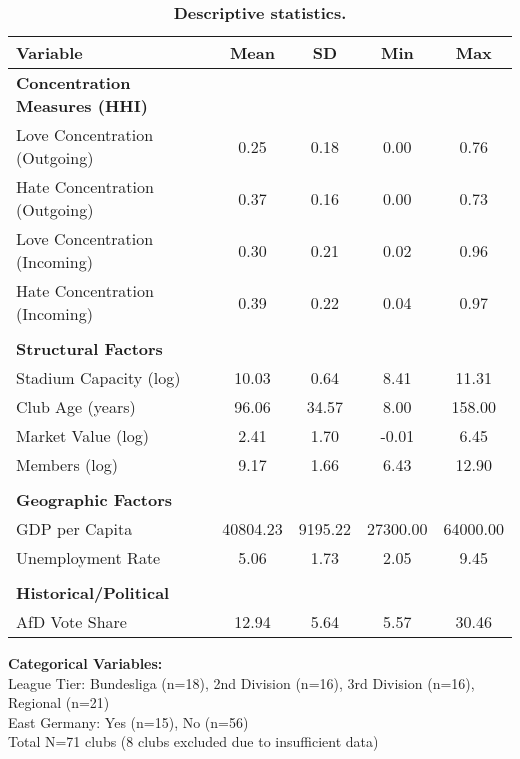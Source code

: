 \begin{table}[!ht]
\centering
\caption{\textbf{Descriptive statistics.}}
\begin{tabular}{lcccc}
\hline
\textbf{Variable} & \textbf{Mean} & \textbf{SD} & \textbf{Min} & \textbf{Max} \\
\hline
\textbf{Concentration Measures (HHI)} & & & & \\
Love Concentration (Outgoing) & 0.25 & 0.18 & 0.00 & 0.76 \\
Hate Concentration (Outgoing) & 0.37 & 0.16 & 0.00 & 0.73 \\
Love Concentration (Incoming) & 0.30 & 0.21 & 0.02 & 0.96 \\
Hate Concentration (Incoming) & 0.39 & 0.22 & 0.04 & 0.97 \\
& & & & \\
\textbf{Structural Factors} & & & & \\
Stadium Capacity (log) & 10.03 & 0.64 & 8.41 & 11.31 \\
Club Age (years) & 96.06 & 34.57 & 8.00 & 158.00 \\
Market Value (log) & 2.41 & 1.70 & -0.01 & 6.45 \\
Members (log) & 9.17 & 1.66 & 6.43 & 12.90 \\
& & & & \\
\textbf{Geographic Factors} & & & & \\
GDP per Capita & 40804.23 & 9195.22 & 27300.00 & 64000.00 \\
Unemployment Rate & 5.06 & 1.73 & 2.05 & 9.45 \\
& & & & \\
\textbf{Historical/Political} & & & & \\
AfD Vote Share & 12.94 & 5.64 & 5.57 & 30.46 \\
\hline
\end{tabular}
\begin{flushleft}
\textbf{Categorical Variables:} \\
League Tier: Bundesliga (n=18), 2nd Division (n=16), 3rd Division (n=16), Regional (n=21) \\
East Germany: Yes (n=15), No (n=56) \\
Total N=71 clubs (8 clubs excluded due to insufficient data)
\end{flushleft}
\label{table_descriptives}
\end{table}

